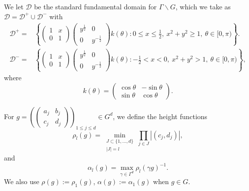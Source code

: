 \documentclass[12pt]{amsart}
\theoremstyle{definition}
\theoremstyle{remark}
\numberwithin{equation}{section}
\newcommand{\cD}{\mathcal{D}}
\begin{document}
We let $\cD$ be the standard fundamental domain for $\Gamma \backslash G$, which we take as $\cD = \cD^+ \cup \cD^-$ with
\begin{equation}
  \label{eq:standardfunddom}
  \begin{split}
    \cD^+ = & \left\{
    \begin{pmatrix}
      1 & x \\
      0 & 1
    \end{pmatrix}
    \begin{pmatrix}
      y^{\frac{1}{2}} & 0 \\
      0 & y^{-\frac{1}{2}}
    \end{pmatrix}
    k(\theta)    : 
    0 \leq x \leq \tfrac{1}{2},\ x^2 + y^2 \geq 1,\ \theta \in [0, \pi)\right\}. \\
    \cD^- = & \left\{
    \begin{pmatrix}
      1 & x \\
      0 & 1
    \end{pmatrix}
    \begin{pmatrix}
      y^{\frac{1}{2}} & 0 \\
      0 & y^{-\frac{1}{2}}
    \end{pmatrix}
    k(\theta)          : 
   -\tfrac{1}{2} < x < 0,\ x^2 + y^2 > 1,\ \theta \in [0, \pi)\right\},
  \end{split} 
\end{equation}
where
\begin{equation}
k(\theta) = \begin{pmatrix}
      \cos \theta & -\sin \theta \\
      \sin \theta & \cos \theta
    \end{pmatrix} .
\end{equation}

For $g = \left(
\begin{pmatrix}
  a_j & b_j \\
  c_j & d_j
\end{pmatrix}
\right)_{\!\!1\leq j\leq d} \in G^d$, we define the height functions
\begin{equation}
  \label{eq:rholdef}
  \rho_l(g) = \min_{\substack{J \subset \{1, \dots, d\} \\ |J| = l}} \prod_{j \in J} |(c_j, d_j)|,
\end{equation}
and
\begin{equation}
  \label{eq:alphaldef}
  \alpha_l(g) = \max_{\gamma \in \Gamma^d} \rho_l(\gamma g)^{-1}.
\end{equation}
We also use $\rho(g) := \rho_1(g)$, $\alpha(g) := \alpha_1(g)$ when $g \in G$.
\end{document}
